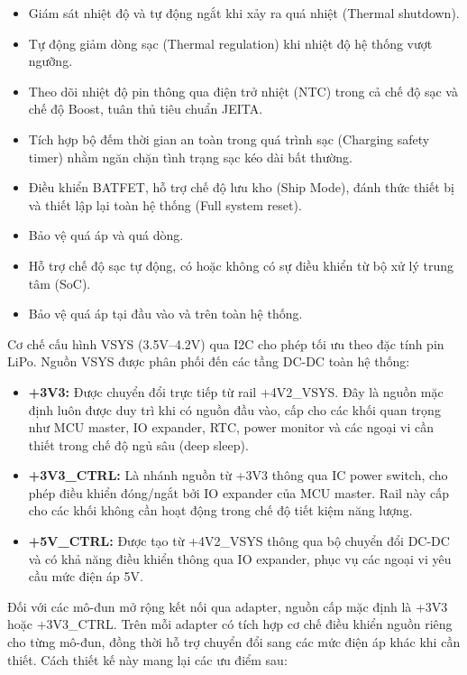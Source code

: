            \begin{itemize}
                \item Giám sát nhiệt độ và tự động ngắt khi xảy ra quá nhiệt (Thermal shutdown).
                \item Tự động giảm dòng sạc (Thermal regulation) khi nhiệt độ hệ thống vượt ngưỡng.
                \item Theo dõi nhiệt độ pin thông qua điện trở nhiệt (NTC) trong cả chế độ sạc và chế độ Boost, tuân thủ tiêu chuẩn JEITA.
                \item Tích hợp bộ đếm thời gian an toàn trong quá trình sạc (Charging safety timer) nhằm ngăn chặn tình trạng sạc kéo dài bất thường.
                \item Điều khiển BATFET, hỗ trợ chế độ lưu kho (Ship Mode), đánh thức thiết bị và thiết lập lại toàn hệ thống (Full system reset).
                \item Bảo vệ quá áp và quá dòng.
                \item Hỗ trợ chế độ sạc tự động, có hoặc không có sự điều khiển từ bộ xử lý trung tâm (SoC).
                \item Bảo vệ quá áp tại đầu vào và trên toàn hệ thống.
            \end{itemize}
            Cơ chế cấu hình VSYS (3.5V--4.2V) qua I2C cho phép tối ưu theo đặc tính pin LiPo. Nguồn VSYS được phân phối đến các tầng DC-DC toàn hệ thống:
            \begin{itemize}
                \item \textbf{+3V3:} Được chuyển đổi trực tiếp từ rail +4V2\_VSYS. Đây là nguồn mặc định luôn được duy trì khi có nguồn đầu vào, cấp cho các khối quan trọng như MCU master, IO expander, RTC, power monitor và các ngoại vi cần thiết trong chế độ ngủ sâu (deep sleep).
                \item \textbf{+3V3\_CTRL:} Là nhánh nguồn từ +3V3 thông qua IC power switch, cho phép điều khiển đóng/ngắt bởi IO expander của MCU master. Rail này cấp cho các khối không cần hoạt động trong chế độ tiết kiệm năng lượng.
                \item \textbf{+5V\_CTRL:} Được tạo từ +4V2\_VSYS thông qua bộ chuyển đổi DC-DC và có khả năng điều khiển thông qua IO expander, phục vụ các ngoại vi yêu cầu mức điện áp 5V.
            \end{itemize}
            Đối với các mô-đun mở rộng kết nối qua adapter, nguồn cấp mặc định là +3V3 hoặc +3V3\_CTRL. Trên mỗi adapter có tích hợp cơ chế điều khiển nguồn riêng cho từng mô-đun, đồng thời hỗ trợ chuyển đổi sang các mức điện áp khác khi cần thiết. Cách thiết kế này mang lại các ưu điểm sau:
